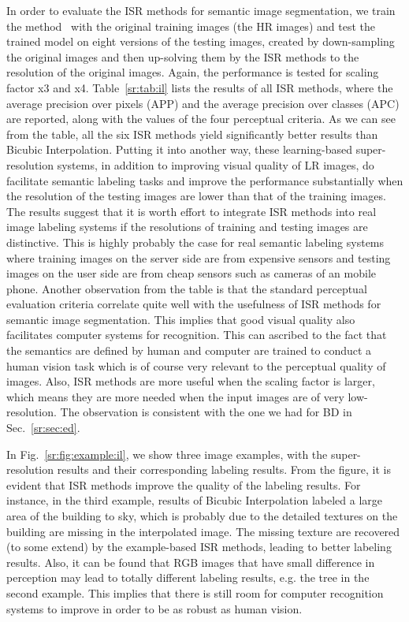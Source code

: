 In order to evaluate the ISR methods for semantic image segmentation, we train the
method~\citep{superpixel:eccv14} with the original training images (\eg the HR images) and
test the trained model on eight versions of the testing images,
created by down-sampling the original images and then up-solving them
by the ISR methods to the resolution of the original images. Again,
the performance is tested for scaling factor x3 and x4.
Table~\ref{sr:tab:il} lists the results of all ISR methods, where the
average precision over pixels (APP) and the average precision over
classes (APC) are reported, along with the values of the four
perceptual criteria. As we can see from the table, all the six ISR
methods yield significantly better results than Bicubic
Interpolation. Putting it into another way, these learning-based
super-resolution systems, in addition to improving visual quality of
LR images, do facilitate semantic labeling tasks and improve the
performance substantially when the resolution of the testing images
are lower than that of the training images. The results suggest that
it is worth effort to integrate ISR methods into real image
labeling systems if the resolutions of training and testing images are
distinctive. This is highly probably the case for real semantic labeling
systems where training images on the server side are from expensive
sensors and testing images on the user side are from cheap sensors
such as cameras of an mobile phone. Another observation from the table
is that the standard perceptual evaluation criteria  correlate
quite well with the usefulness of ISR methods for semantic image segmentation. This
implies that good visual quality also facilitates computer systems for
recognition. This can ascribed to the fact that the semantics are
defined by human and computer are trained to conduct a human vision
task which is of course very relevant to the perceptual quality of
images. Also, ISR methods are more useful when the scaling factor is
larger, which means they are more needed when the input images are
of very low-resolution.  The observation is consistent with the one we had for
BD in Sec.~\ref{sr:sec:ed}.



In Fig.~\ref{sr:fig:example:il}, we show three image examples, with the
super-resolution results and their corresponding labeling
results. From the figure, it is evident that ISR methods improve the
quality of the labeling results. For instance, in the third example,
results of Bicubic Interpolation labeled a large area of the building
to sky, which is probably due to the detailed textures on the building
are missing in the interpolated image. The missing texture  are recovered (to some
extend) by the example-based ISR methods, leading to better labeling
results. Also, it can be found that RGB images that have small
difference in perception may lead to totally different labeling
results, e.g. the tree in the second example. This implies that there
is still room for computer recognition systems to improve
in order to be as robust as human vision.  

